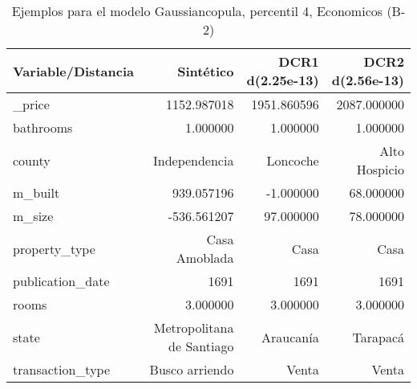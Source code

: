 \begin{table}[H]
\centering
\fontsize{10}{14}\selectfont
\caption{Ejemplos para el modelo Gaussiancopula, percentil 4, Economicos (B-2)}
\label{table-example-economicos-b-2-gaussiancopula-4p}
\begin{tabular}{|l|r|r|r|}
\hline
\rowcolor[gray]{0.8}
Variable/Distancia & Sintético & DCR1 d(2.25e-13) & DCR2 d(2.56e-13) \\
\hline \_price & \cellcolor[rgb]{0.9, 0.54, 0.52} 1152.987018 & 1951.860596 & 2087.000000 \\
\hline bathrooms & \cellcolor[rgb]{0.9, 0.54, 0.52} 1.000000 & \cellcolor[rgb]{0.9, 0.54, 0.52} 1.000000 & \cellcolor[rgb]{0.9, 0.54, 0.52} 1.000000 \\
\hline county & \cellcolor[rgb]{0.9, 0.54, 0.52} Independencia & Loncoche & Alto Hospicio \\
\hline m\_built & \cellcolor[rgb]{0.9, 0.54, 0.52} 939.057196 & -1.000000 & 68.000000 \\
\hline m\_size & \cellcolor[rgb]{0.9, 0.54, 0.52} -536.561207 & 97.000000 & 78.000000 \\
\hline property\_type & \cellcolor[rgb]{0.9, 0.54, 0.52} Casa Amoblada & Casa & Casa \\
\hline publication\_date & \cellcolor[rgb]{0.9, 0.54, 0.52} 1691 & \cellcolor[rgb]{0.9, 0.54, 0.52} 1691 & \cellcolor[rgb]{0.9, 0.54, 0.52} 1691 \\
\hline rooms & \cellcolor[rgb]{0.9, 0.54, 0.52} 3.000000 & \cellcolor[rgb]{0.9, 0.54, 0.52} 3.000000 & \cellcolor[rgb]{0.9, 0.54, 0.52} 3.000000 \\
\hline state & \cellcolor[rgb]{0.9, 0.54, 0.52} Metropolitana de Santiago & Araucanía & Tarapacá \\
\hline transaction\_type & \cellcolor[rgb]{0.9, 0.54, 0.52} Busco arriendo & Venta & Venta \\
\hline
\end{tabular}
\end{table}
